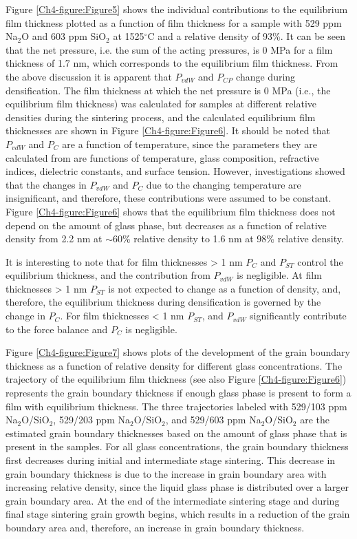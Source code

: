 Figure \ref{Ch4-figure:Figure5} shows the individual contributions to the equilibrium film thickness plotted as a function of film thickness for a sample with 529 ppm Na$_{2}$O and 603 ppm SiO$_{2}$ at 1525$^{\circ}$C and a relative density of 93\%. It can be seen that the net pressure, i.e. the sum of the acting pressures, is 0 MPa for a film thickness of 1.7 nm, which corresponds to the equilibrium film thickness. From the above discussion it is apparent that $P_{vdW}$ and $P_{CP}$ change during densification. The film thickness at which the net pressure is 0 MPa (i.e., the equilibrium film thickness) was calculated for samples at different relative densities during the sintering process, and the calculated equilibrium film thicknesses are shown in Figure \ref{Ch4-figure:Figure6}. It should be noted that $P_{vdW}$ and $P_{C}$ are a function of temperature, since the parameters they are calculated from are functions of temperature, glass composition, refractive indices, dielectric constants, and surface tension. However, investigations showed that the changes in $P_{vdW}$ and $P_{C}$ due to the changing temperature are insignificant, and therefore, these contributions were assumed to be constant. Figure \ref{Ch4-figure:Figure6} shows that the equilibrium film thickness does not depend on the amount of glass phase, but decreases as a function of relative density from 2.2 nm at $\sim$60\% relative density to 1.6 nm at 98\% relative density. 

It is interesting to note that for film thicknesses > 1 nm $P_{C}$ and $P_{ST}$ control the equilibrium thickness, and the contribution from $P_{vdW}$ is negligible. At film thicknesses > 1 nm $P_{ST}$ is not expected to change as a function of density, and, therefore, the equilibrium thickness during densification is governed by the change in $P_{C}$. For film thicknesses < 1 nm $P_{ST}$, and $P_{vdW}$ significantly contribute to the force balance and $P_{C}$ is negligible.

Figure \ref{Ch4-figure:Figure7} shows plots of the development of the grain boundary thickness as a function of relative density for different glass concentrations. The trajectory of the equilibrium film thickness (see also Figure \ref{Ch4-figure:Figure6}) represents the grain boundary thickness if enough glass phase is present to form a film with equilibrium thickness. The three trajectories labeled with 529/103 ppm Na$_{2}$O/SiO$_{2}$, 529/203 ppm Na$_{2}$O/SiO$_{2}$, and 529/603 ppm Na$_{2}$O/SiO$_{2}$ are the estimated grain boundary thicknesses based on the amount of glass phase that is present in the samples. For all glass concentrations, the grain boundary thickness first decreases during initial and intermediate stage sintering. This decrease in grain boundary thickness is due to the increase in grain boundary area with increasing relative density, since the liquid glass phase is distributed over a larger grain boundary area. At the end of the intermediate sintering stage and during final stage sintering grain growth begins, which results in a reduction of the grain boundary area and, therefore, an increase in grain boundary thickness. 

